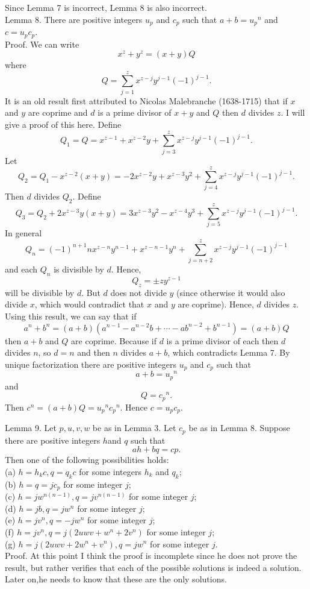 \documentclass[12pt]{article}
\begin{document}
Since Lemma 7 is incorrect, Lemma 8 is also incorrect. \\
Lemma 8.  There are positive integers
$u_p$ and $c_p$ such that
$a+b = {u_p}^n$ and $c=u_pc_p$. \\
Proof.  We can write
$$
x^z+y^z = (x+y)Q
$$
where
$$
Q=\sum_{j=1}^zx^{z-j}y^{j-1}(-1)^{j-1}.
$$
It is an old result first attributed to Nicolas Malebranche (1638-1715) 
that if $x$ and $y$ are coprime and $d$ is a prime divisor of 
$x+y$ and $Q$ then $d$ divides $z$. I will give a proof of this here.
Define 
$$
Q_1 = Q = x^{z-1} + x^{z-2}y + \sum_{j=3}^zx^{z-j}y^{j-1}(-1)^{j-1}.
$$
Let
$$
Q_2 = Q_1 - x^{z-2}(x+y) = -2x^{z-2}y + x^{z-3}y^2+ \sum_{j=4}^zx^{z-j}y^{j-1}(-1)^{j-1}.
$$
Then $d$ divides $Q_2$.
Define 
$$
Q_3 = Q_2 + 2x^{z-3}y(x+y) = 3x^{z-3}y^2-x^{z-4}y^3 + \sum_{j=5}^zx^{z-j}y^{j-1}(-1)^{j-1}.
$$
In general 
$$
Q_n = (-1)^{n+1}nx^{z-n}y^{n-1}+x^{z-n-1}y^n + \sum_{j=n+2}^zx^{z-j}y^{j-1}(-1)^{j-1}
$$
and each $Q_n$ is divisible by $d$. Hence,
$$
Q_z = \pm zy^{z-1}
$$
will be divisible by $d$. But $d$ does not divide $y$ (since otherwise it would also divide
$x$, which would contradict that $x$ and $y$ are coprime). Hence, $d$ divides $z$. 
Using this result, we can say that
if
$$
a^n+b^n = (a+b)(a^{n-1}-a^{n-2}b+\cdots-ab^{n-2}+b^{n-1}) = (a+b)Q
$$
then $a+b$ and $Q$ are coprime. Because if $d$ is a prime divisor of each
then $d$ divides $n$, so $d=n$ and then $n$ divides $a+b$, which contradicts Lemma 7.
By unique factorization there  are positive integers $u_p$ and $c_p$
such that
$$
a+b = {u_p}^n
$$
and
$$
Q = {c_p}^n .
$$
Then $c^n = (a+b)Q = {u_p}^n {c_p}^n$.
Hence $c = u_p c_p$.

Lemma 9. Let $p,u,v,w$ be as in Lemma 3. Let $c_p$ be as in 
Lemma 8.  Suppose there are positive integers $h$and $q$  such that
$$
ah + bq = cp .
$$
Then one of the following possibilities holds: \\
(a) $h = h_k c, q = q_k c$ for some integers $h_k$ and $q_k$; \\
(b) $h = q = jc_p$ for some integer $j$; \\
(c) $h = jw^{n(n-1)}, q = j v^{n(n-1)}$ for some integer $j$;  \\
(d) $h = jb, q = jw^n$ for some integer $j$; \\
(e) $h = jv^n, q = -jw^n$ for some integer $j$; \\
(f) $h = jv^n, q = j(2uwv+w^n+2v^n)$ for some integer $j$; \\
(g) $h=j(2uwv+2w^n+v^n), q=jw^n$ for some integer $j$. \\
Proof. At this point I think the proof is incomplete since he does not prove the result, but rather
verifies that each of the possible solutions is indeed a solution. Later on,he needs to know that these
are the only solutions.
\end{document}
